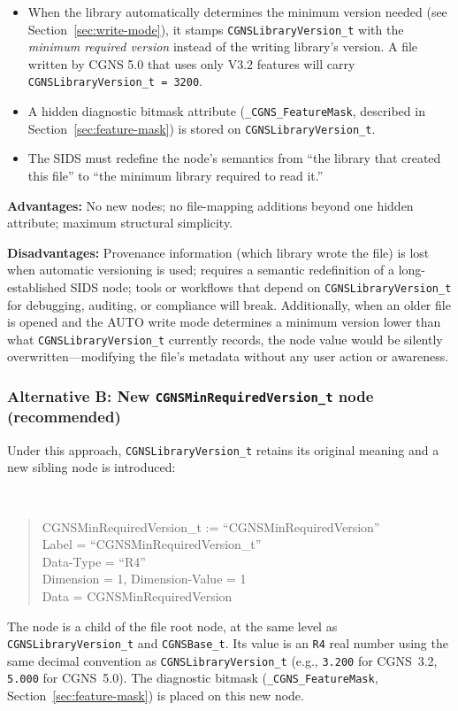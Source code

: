 \documentclass[11pt,letterpaper]{article}
\newenvironment{sidsnode}[1]{%
  \par\vspace{0.8em}%
  \noindent\colorbox{cgnslight!50}{\makebox[\dimexpr\linewidth-2\fboxsep][l]{%
    \texttt{\textbf{\color{cgnsblue}#1}}}}\\[0.3em]%
  \begin{quote}\ttfamily
}{%
  \end{quote}\vspace{0.4em}%
}
\begin{document}
\begin{itemize}[leftmargin=2em]
\item When the library automatically determines the minimum version
  needed (see Section~\ref{sec:write-mode}), it stamps
  \texttt{CGNSLibraryVersion\_t} with the \emph{minimum required
  version} instead of the writing library's version.  A file written
  by CGNS 5.0 that uses only V3.2 features will carry
  \texttt{CGNSLibraryVersion\_t = 3200}.
\item A hidden diagnostic bitmask attribute
  (\texttt{\_CGNS\_FeatureMask}, described in
  Section~\ref{sec:feature-mask}) is stored on
  \texttt{CGNSLibraryVersion\_t}.
\item The SIDS must redefine the node's semantics from ``the library
  that created this file'' to ``the minimum library required to read
  it.''
\end{itemize}

\textbf{Advantages:}  No new nodes; no file-mapping additions beyond
one hidden attribute; maximum structural simplicity.

\textbf{Disadvantages:}  Provenance information (which library wrote
the file) is lost when automatic versioning is used; requires a
semantic redefinition of a long-established SIDS node; tools or
workflows that depend on \texttt{CGNSLibraryVersion\_t} for
debugging, auditing, or compliance will break.  Additionally, when an
older file is opened and the AUTO write mode determines a minimum
version lower than what \texttt{CGNSLibraryVersion\_t} currently
records, the node value would be silently overwritten---modifying the
file's metadata without any user action or awareness.

\subsubsection{Alternative B: New \texttt{CGNSMinRequiredVersion\_t}
  node (recommended)}

Under this approach, \texttt{CGNSLibraryVersion\_t} retains its
original meaning and a new sibling node is introduced:

\begin{sidsnode}{CGNSMinRequiredVersion\_t}
CGNSMinRequiredVersion\_t := ``CGNSMinRequiredVersion'' \\
  Label = ``CGNSMinRequiredVersion\_t'' \\
  Data-Type = ``R4'' \\
  Dimension = 1, Dimension-Value = 1 \\
  Data = CGNSMinRequiredVersion
\end{sidsnode}
\noindent The node is a child of the file root node, at the same level as
\texttt{CGNSLibraryVersion\_t} and \texttt{CGNSBase\_t}.  Its value
is an \texttt{R4} real number using the same decimal convention as
\texttt{CGNSLibraryVersion\_t} (e.g., \texttt{3.200} for CGNS~3.2,
\texttt{5.000} for CGNS~5.0).
The diagnostic bitmask (\texttt{\_CGNS\_FeatureMask},
Section~\ref{sec:feature-mask}) is placed on this new node.
\end{document}
